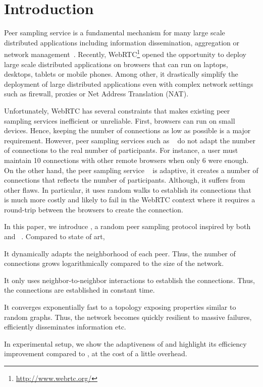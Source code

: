 
\section{Introduction}

Peer sampling service is a fundamental mechanism for many large scale
distributed applications including information dissemination, aggregation
 or network management~\cite{jelasity2007gossip}. Recently,
WebRTC\footnote{\url{http://www.webrtc.org/}} opened the opportunity to deploy large scale distributed
applications on browsers that can run on laptops, desktops, tablets or mobile
phones. Among other, it drastically simplify the deployment of large
distributed applications even with complex network settings such as firewall,
proxies or Net Address Translation (NAT).

Unfortunately, WebRTC has several constraints that makes existing peer sampling
services inefficient or unreliable. First, browsers can run on small
devices. Hence, keeping the number of connections as low as possible is a major
requirement. However, peer sampling services such as \CYCLON{}~\cite{
  voulgaris2005cyclon} do not adapt the number of connections to the real
number of participants. For instance, a user must maintain 10 connections with
other remote browsers when only 6 were enough. On the other hand, the peer
sampling service \SCAMP{}~\cite{ganesh2003peer} is adaptive, it creates a
number of connections that reflects the number of participants. Although, it
suffers from other flaws. In particular, it uses random walks to establish its
connections that is much more costly and likely to fail in the WebRTC context
where it requires a round-trip between the browsers to create the connection.

In this paper, we introduce \SCAMPLON{}, a random peer sampling protocol
inspired by both \SCAMP{}~\cite{ganesh2003peer} and
\CYCLON{}~\cite{voulgaris2005cyclon}. Compared to state of art,
\begin{inparaenum}[(i)]
\item It dynamically adapts the neighborhood of each peer. Thus, the number of
  connections grows logarithmically compared to the size of the network.
\item It only uses neighbor-to-neighbor interactions to establish the
  connections. Thus, the connections are established in constant time.
\item It converges exponentially fast to a topology exposing properties similar
  to random graphs. Thus, the network becomes quickly resilient to massive
  failures, efficiently disseminates information etc.
\item In experimental setup, we show the adaptiveness of \SCAMPLON{} and
  highlight its efficiency improvement compared to \CYCLON{}, at the cost of a
  little overhead.
\end{inparaenum}

